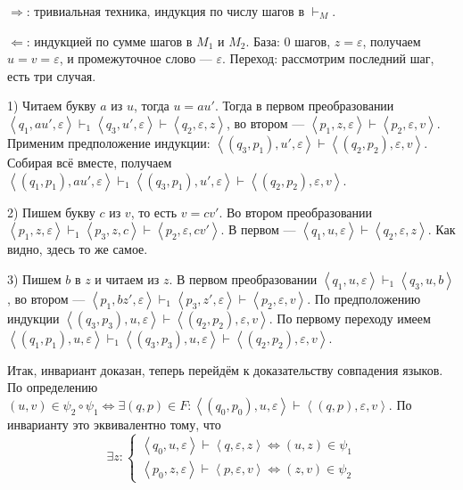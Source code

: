 $\Rightarrow$: тривиальная техника, индукция по числу шагов в $\vdash_M$.

$\Leftarrow$: индукцией по сумме шагов в $M_1$ и $M_2$.
База: 0 шагов, $z = \varepsilon$, получаем $u = v = \varepsilon$, и промежуточное слово --- $\varepsilon$.
Переход: рассмотрим последний шаг, есть три случая.

1) Читаем букву $a$ из $u$, тогда $u = au'$.
Тогда в первом преобразовании $\left< q_1, au', \varepsilon \right> \vdash_1 \left<q_3, u', \varepsilon \right> \vdash \left<q_2, \varepsilon, z \right>$, во втором --- $\left< p_1, z, \varepsilon \right> \vdash \left< p_2, \varepsilon, v \right>$.
Применим предположение индукции: $\left<(q_3, p_1), u', \varepsilon \right> \vdash \left<(q_2, p_2), \varepsilon, v \right>$.
Собирая всё вместе, получаем $\left<(q_1, p_1), au', \varepsilon \right> \vdash_1 \left<(q_3, p_1), u', \varepsilon \right> \vdash \left<(q_2, p_2), \varepsilon, v \right>$.

2) Пишем букву $c$ из $v$, то есть $v = cv'$.
Во втором преобразовании $\left<p_1, z, \varepsilon \right> \vdash_1 \left<p_3, z, c \right> \vdash \left<p_2, \varepsilon, cv' \right>$.
В первом --- $\left< q_1, u, \varepsilon \right> \vdash \left< q_2, \varepsilon, z \right>$.
Как видно, здесь то же самое.

3) Пишем $b$ в $z$ и читаем из $z$.
В первом преобразовании $\left<q_1, u, \varepsilon \right> \vdash_1 \left< q_3, u, b \right>$, во втором --- $\left<p_1, bz', \varepsilon \right> \vdash_1 \left<p_3, z', \varepsilon \right> \vdash \left<p_2, \varepsilon, v \right>$.
По предположению индукции $\left<(q_3, p_3), u, \varepsilon \right> \vdash \left<(q_2, p_2), \varepsilon, v \right>$.
По первому переходу имеем $\left<(q_1, p_1), u, \varepsilon \right> \vdash_1 \left<(q_3, p_3), u, \varepsilon \right> \vdash \left<(q_2, p_2), \varepsilon, v \right>$.

Итак, инвариант доказан, теперь перейдём к доказательству совпадения языков.
По определению $(u, v) \in \psi_2 \circ \psi_1 \iff \exists (q, p) \in F: \left<(q_0, p_0), u, \varepsilon \right> \vdash \left<(q, p), \varepsilon, v \right>$.
По инварианту это эквивалентно тому, что 
\[
    \exists z:
    \begin{cases}
        \left<q_0, u, \varepsilon \right> \vdash \left<q, \varepsilon, z \right> \iff (u, z) \in \psi_1 \\
        \left<p_0, z, \varepsilon \right> \vdash \left<p, \varepsilon, v \right> \iff (z, v) \in \psi_2
    \end{cases}
\]

